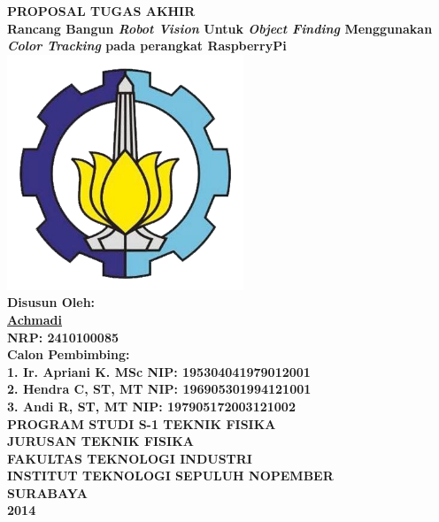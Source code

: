 \documentclass[a4paper,12pt]{article}
\title{}
\author{}
\date{}
\begin{document}
\begin{center}
  \textbf{ \Large{PROPOSAL TUGAS AKHIR } }\\[5pt]
  \textbf{ \large{Rancang Bangun \textit{Robot Vision} Untuk \textit{Object Finding} Menggunakan \textit{Color Tracking} pada perangkat RaspberryPi } }
  \\[50pt]
  \includegraphics[width=200pt]{ITS}
  \\[50pt]
  \textbf{ \large{Disusun Oleh:} }\\
  \underline{\textbf{ \large{Achmadi} } }\\
  \textbf{ \large{NRP: 2410100085 } }\\[40pt]
  \textbf{ \large{Calon Pembimbing: } }\\
  \textbf{ \large{1. Ir. Apriani K. MSc \hspace{35pt} NIP: 195304041979012001} }\\
  \textbf{ \large{2. Hendra C, ST, MT \hspace{35pt} NIP: 196905301994121001} }\\
  \textbf{ \large{3. Andi R, ST, MT \hspace{35pt} NIP: 197905172003121002} }\\[60pt]
  \textbf{ \large{PROGRAM STUDI S-1 TEKNIK FISIKA } }\\
  \textbf{ \large{JURUSAN TEKNIK FISIKA } }\\
  \textbf{ \large{FAKULTAS TEKNOLOGI INDUSTRI } }\\
  \textbf{ \large{INSTITUT TEKNOLOGI SEPULUH NOPEMBER } }\\
  \textbf{ \large{SURABAYA } }\\
  \textbf{ \large{2014 } }\\
\end{center}
\end{document}
